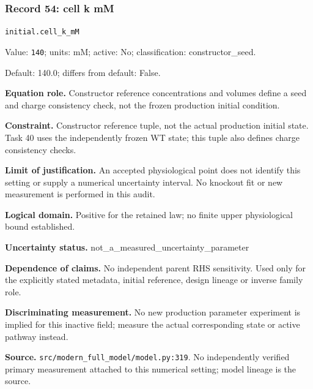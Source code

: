 \subsubsection*{Record 54: cell k mM}
{\small \nolinkurl{initial.cell_k_mM}\par

Value: \texttt{140}; units: mM; active: No; classification: constructor\_seed.\par

Default: 140.0; differs from default: False.\par

\textbf{Equation role.} Constructor reference concentrations and volumes define a seed and charge consistency check, not the frozen production initial condition.\par

\textbf{Constraint.} Constructor reference tuple, not the actual production initial state. Task 40 uses the independently frozen WT state; this tuple also defines charge consistency checks.\par

\textbf{Limit of justification.} An accepted physiological point does not identify this setting or supply a numerical uncertainty interval. No knockout fit or new measurement is performed in this audit.\par

\textbf{Logical domain.} Positive for the retained law; no finite upper physiological bound established.\par

\textbf{Uncertainty status.} not\_a\_measured\_uncertainty\_parameter\par

\textbf{Dependence of claims.} No independent parent RHS sensitivity. Used only for the explicitly stated metadata, initial reference, design lineage or inverse family role.\par

\textbf{Discriminating measurement.} No new production parameter experiment is implied for this inactive field; measure the actual corresponding state or active pathway instead.\par

\textbf{Source.} \nolinkurl{src/modern_full_model/model.py:319}. No independently verified primary measurement attached to this numerical setting; model lineage is the source.\par}

